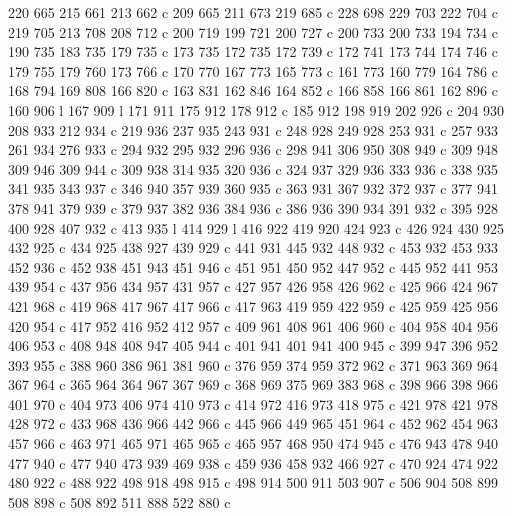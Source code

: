 {{        220 665 215 661 213 662 c
        209 665 211 673 219 685 c
        228 698 229 703 222 704 c
        219 705 213 708 208 712 c
        200 719 199 721 200 727 c
        200 733 200 733 194 734 c
        190 735 183 735 179 735 c
        173 735 172 735 172 739 c
        172 741 173 744 174 746 c
        179 755 179 760 173 766 c
        170 770 167 773 165 773 c
        161 773 160 779 164 786 c
        168 794 169 808 166 820 c
        163 831 162 846 164 852 c
        166 858 166 861 162 896 c
        160 906 l
        167 909 l
        171 911 175 912 178 912 c
        185 912 198 919 202 926 c
        204 930 208 933 212 934 c
        219 936 237 935 243 931 c
        248 928 249 928 253 931 c
        257 933 261 934 276 933 c
        294 932 295 932 296 936 c
        298 941 306 950 308 949 c
        309 948 309 946 309 944 c
        309 938 314 935 320 936 c
        324 937 329 936 333 936 c
        338 935 341 935 343 937 c
        346 940 357 939 360 935 c
        363 931 367 932 372 937 c
        377 941 378 941 379 939 c
        379 937 382 936 384 936 c
        386 936 390 934 391 932 c
        395 928 400 928 407 932 c
        413 935 l
        414 929 l
        416 922 419 920 424 923 c
        426 924 430 925 432 925 c
        434 925 438 927 439 929 c
        441 931 445 932 448 932 c
        453 932 453 933 452 936 c
        452 938 451 943 451 946 c
        451 951 450 952 447 952 c
        445 952 441 953 439 954 c
        437 956 434 957 431 957 c
        427 957 426 958 426 962 c
        425 966 424 967 421 968 c
        419 968 417 967 417 966 c
        417 963 419 959 422 959 c
        425 959 425 956 420 954 c
        417 952 416 952 412 957 c
        409 961 408 961 406 960 c
        404 958 404 956 406 953 c
        408 948 408 947 405 944 c
        401 941 401 941 400 945 c
        399 947 396 952 393 955 c
        388 960 386 961 381 960 c
        376 959 374 959 372 962 c
        371 963 369 964 367 964 c
        365 964 364 967 367 969 c
        368 969 375 969 383 968 c
        398 966 398 966 401 970 c
        404 973 406 974 410 973 c
        414 972 416 973 418 975 c
        421 978 421 978 428 972 c
        433 968 436 966 442 966 c
        445 966 449 965 451 964 c
        452 962 454 963 457 966 c
        463 971 465 971 465 965 c
        465 957 468 950 474 945 c
        476 943 478 940 477 940 c
        477 940 473 939 469 938 c
        459 936 458 932 466 927 c
        470 924 474 922 480 922 c
        488 922 498 918 498 915 c
        498 914 500 911 503 907 c
        506 904 508 899 508 898 c
        508 892 511 888 522 880 c
}}

